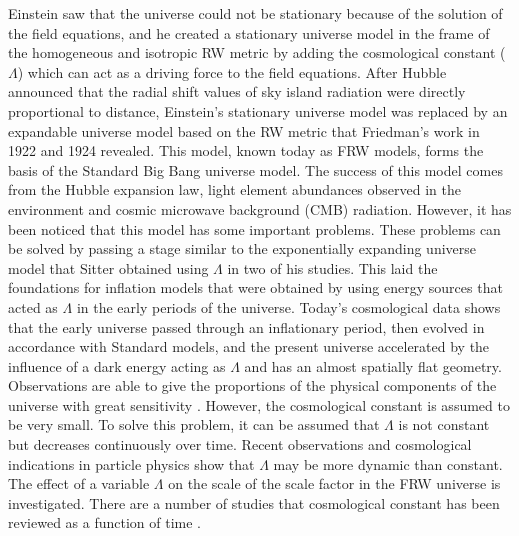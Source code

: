 \documentclass[superscriptaddress,showpacs,pre,twocolumn]{revtex4-1}
\begin{document}
Einstein saw that the universe could not be stationary because of the solution of the field equations, and he created a stationary universe model in the frame of the homogeneous and isotropic RW metric by adding the cosmological constant ($\Lambda$) which can act as a driving force to the field equations. After Hubble announced that the radial shift values of sky island radiation were directly proportional to distance, Einstein's stationary universe model was replaced by an expandable universe model based on the RW metric that Friedman’s work in 1922 and 1924 revealed. This model, known today as FRW models, forms the basis of the Standard Big Bang universe model. The success of this model comes from the Hubble expansion law, light element abundances observed in the environment and cosmic microwave background (CMB) radiation. However, it has been noticed that this model has some important problems. These problems can be solved by passing a stage similar to the exponentially expanding universe model that Sitter obtained using $\Lambda$ in two of his studies. This laid the foundations for inflation models that were obtained by using energy sources that acted as $\Lambda$ in the early periods of the universe. Today's cosmological data shows that the early universe passed through an inflationary period, then evolved in accordance with Standard models, and the present universe accelerated by the influence of a dark energy acting as $\Lambda$ and has an almost spatially flat geometry. Observations are able to give the proportions of the physical components of the universe with great sensitivity \cite{Bergman1968,Linde1974,Perlmuntter1999,Abazajian2004,Peebles2003}. However, the cosmological constant is assumed to be very small. To solve this problem, it can be assumed that $\Lambda$ is not constant but decreases continuously over time. Recent observations and cosmological indications in particle physics show that $\Lambda$ may be more dynamic than constant. The effect of a variable $\Lambda$ on the scale of the scale factor in the FRW universe is investigated. There are a number of studies that cosmological constant has been reviewed as a function of time \cite{Vishwakarna2002,Beesham1999,Peebles1988}.
\end{document}
